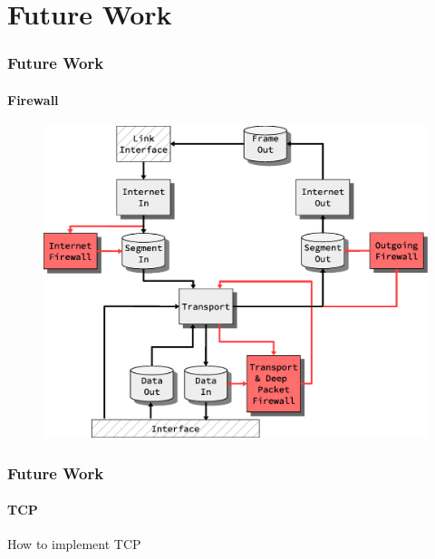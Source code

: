 \section{Future Work}
\begin{frame}
  \frametitle{Future Work}
\framesubtitle{Firewall}
\begin{figure}
\centering
\includegraphics[scale=0.30]{../thesis/future_work/firewall_integration_design.eps}
\end{figure}
\end{frame}


\begin{frame}
  \frametitle{Future Work}
\framesubtitle{TCP}
How to implement TCP
\end{frame}


